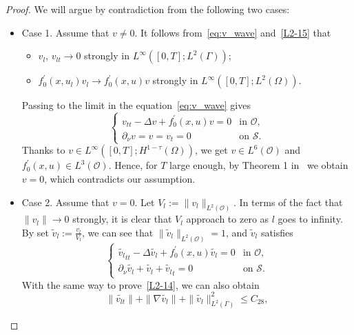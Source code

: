 \documentclass{elsarticle}
\begin{document}
\begin{proof}
We will argue by contradiction from the following two cases:
\begin{itemize}
\item
Case 1. Assume that $v\neq 0$.
	It follows from~\eqref{eq:v_wave} and~\eqref{L2-15} that
	\begin{itemize}
		\item $v_l$, $v_{lt} \rightarrow 0$ strongly in $L^{\infty}([0, T]; L^{2}(\Gamma))$; 
		\item $f^{\prime}_0(x, u_l)v_l \rightarrow f^{\prime}_0(x, u)v$ strongly in $L^{\infty}([0, T]; L^{2}(\Omega))$.
	\end{itemize}
	Passing to the limit in the equation~\eqref{eq:v_wave} gives
	\begin{equation}
	\left
		\{
        			\begin{array}{ll}
            			v_{tt} - \Delta v +f^{\prime}_0(x, u)v= 0 &\textrm{in $\mathcal{O}$,}  \\
                	 		\partial_{\nu}v = v = v_t= 0 &\textrm{on $\mathcal{S}$}.
       			 \end{array}
	\right.
	\end{equation}
Thanks to $v\in L^{\infty}([0, T]; H^{1-\tau}(\Omega))$, we get $v\in L^{6}(\mathcal{O})$ and $f^{\prime}_0(x, u)\in L^{3}(\mathcal{O})$. Hence, for $T$ large enough, by Theorem 1 in~\cite{ruiz1992unique} we obtain $v= 0$, which contradicts our assumption.
\item
Case 2. Assume that $v=0$.
Let $V_l := \| v_l \|_{L^{2}(\mathcal{O})}$. In terms of the fact that $\| v_l \| \rightarrow 0$ strongly, it is clear that $V_l$ approach to zero as $l$ goes to infinity. 
By set $\tilde{v}_{l} := \frac{v_l}{V_l }$, we can see that $\| \tilde{v}_l \|_{L^{2}(\mathcal{O})}= 1$, and $\tilde{v}_l$ satisfies
\begin{equation}
\left
    \{
        \begin{array}{ll}
            \tilde{v_l}_{tt} - \Delta \tilde{v_l} +f^{\prime}_0(x, u)\tilde{v_l}= 0 & \textrm{in $\mathcal{O}$,}  \\
                 \partial_{\nu}\tilde{v_l} + \tilde{v_l} +\tilde{v_l}_t= 0 &\textrm{on $\mathcal{S}$.}
        \end{array}
\right. \label{L2-16}
\end{equation}
With the same way to prove~\eqref{L2-14}, we can also obtain
\begin{equation}
	\|\tilde{v_{lt}}\| +\|\nabla \tilde{v_l}\| +\|\tilde{v_l}\|_{L^2(\Gamma)}^{2} \leq C_{28}, \label{L2-17}
\end{equation}

\end{itemize}
\end{proof}
\end{document}
